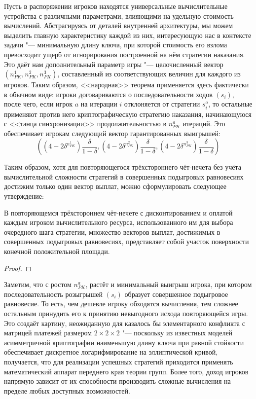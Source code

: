Пусть в распоряжении игроков находятся универсальные вычислительные устройства с различными параметрами, влияющими на удельную стоимость вычислений. Абстрагируясь от деталей внутренней архитектуры, мы можем выделить главную характеристику каждой из них, интересующую нас в контексте задачи "--- минимальную длину ключа, при которой стоимость его взлома превосходит ущерб от игнорирования построенной на нём стратегии наказания. Это даёт нам дополнительный параметр игры "--- целочисленный вектор $(n_{PK}^1, n_{PK}^2, n_{PK}^3)$, составленный из соответствующих величин для каждого из игроков. Таким образом, <<народная>> теорема применяется здесь фактически в обычном виде: игроки договариваются о последовательности ходов $(s_i)$, после чего, если игрок $a$ на итерации $i$ отклоняется от стратегии $s^a_i$, то остальные применяют против него криптографическую стратегию наказания, начинающуюся с <<танца синхронизации>> продолжительностью в $n_{PK}^a$ итераций. Это обеспечивает игрокам следующий вектор гарантированных выигрышей:
\begin{equation*}
	((4 - 2 \delta^{n_{PK}^1}) \frac{\delta}{1-\delta}, (4 - 2 \delta^{n_{PK}^2}) \frac{\delta}{1-\delta}, (4 - 2 \delta^{n_{PK}^3}) \frac{\delta}{1-\delta})
\end{equation*}

Таким образом, хотя для повторяющегося трёхстороннего чёт-нечета без учёта вычислительной сложности стратегий в совершенных подыгровых равновесиях достижим только один вектор выплат, можно сформулировать следующее утверждение:
\begin{theorem}
	В повторяющемся трёхстороннем чёт-нечете с дисконтированием и оплатой каждым игроком вычислительного ресурса, использованного им для выбора очередного шага стратегии, множество векторов выплат, достижимых в совершенных подыгровых равновесиях, представляет собой участок поверхности конечной положительной площади.
\end{theorem}
\begin{proof}
	
\end{proof}

Заметим, что с ростом $n_{PK}^a$, растёт и минимальный выигрыш игрока, при котором последовательность розыгрышей $(s_i)$ образует совершенное подыгровое равновесие. То есть, чем дешевле игроку обходятся вычисления, тем сложнее остальным принудить его к принятию невыгодного исхода повторяющейся игры. Это создаёт картину, неожиданную для казалось бы элементарного конфликта с матрицей платежей размером $2 \times 2 \times 2$ "--- поскольку из известных моделей асимметричной криптографии наименьшую длину ключа при равной стойкости обеспечивает дискретное логарифмирование на эллиптической кривой, получается, что для реализации успешных стратегий приходится применять математический аппарат переднего края теории групп. Более того, доход игроков напрямую зависит от их способности производить сложные вычисления на пределе любых доступных возможностей.

